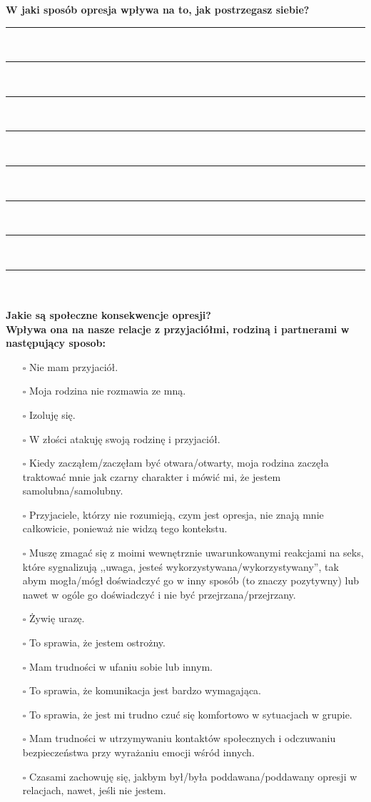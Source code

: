 \newpage
\noindent
\textcolor{ProcessBlue}{\textbf{\Large{W jaki sposób opresja wpływa na to, jak postrzegasz siebie?}}}\\
\noindent\rule{\textwidth}{1pt}\\
\noindent\rule{\textwidth}{1pt}\\
\noindent\rule{\textwidth}{1pt}\\
\noindent\rule{\textwidth}{1pt}\\
\noindent\rule{\textwidth}{1pt}\\
\noindent\rule{\textwidth}{1pt}\\
\noindent\rule{\textwidth}{1pt}\\
\noindent\rule{\textwidth}{1pt}\\\\

\noindent\textcolor{ProcessBlue}{\textbf{\Large{Jakie są społeczne konsekwencje opresji?}}}\\
\textbf{\large{Wpływa ona na nasze relacje z przyjaciółmi, rodziną i partnerami w następujący sposob:}}
\begin{multicols}{2}
\begin{itemize}
\item[$\square$]{Nie mam przyjaciół.}
\item[$\square$]{Moja rodzina nie rozmawia ze mną.}
\item[$\square$]{Izoluję się.}
\item[$\square$]{W złości atakuję swoją rodzinę i przyjaciół.}
\item[$\square$]{Kiedy zacząłem/zaczęłam być otwara/otwarty, moja rodzina zaczęła traktować mnie jak czarny charakter i mówić mi, że jestem samolubna/samolubny.}
\item[$\square$]{Przyjaciele, którzy nie rozumieją, czym jest opresja, nie znają mnie całkowicie, ponieważ nie widzą tego kontekstu.}
\item[$\square$]{Muszę zmagać się z moimi wewnętrznie uwarunkowanymi reakcjami na seks, które sygnalizują ,,uwaga, jesteś wykorzystywana/wykorzystywany'', tak abym mogła/mógł doświadczyć go w inny sposób (to znaczy pozytywny) lub nawet w ogóle go doświadczyć i nie być przejrzana/przejrzany.}
\item[$\square$]{Żywię urazę.}
\item[$\square$]{To sprawia, że jestem ostrożny.}
\item[$\square$]{Mam trudności w ufaniu sobie lub innym.}
\item[$\square$]{To sprawia, że komunikacja jest bardzo wymagająca.}
\item[$\square$]{To sprawia, że jest mi trudno czuć się komfortowo w sytuacjach w grupie.}
\item[$\square$]{Mam trudności w utrzymywaniu kontaktów społecznych i odczuwaniu bezpieczeństwa przy wyrażaniu emocji wśród innych.}
\item[$\square$]{Czasami zachowuję się, jakbym był/była poddawana/poddawany opresji w relacjach, nawet, jeśli nie jestem.}
\end{itemize}
\end{multicols}


